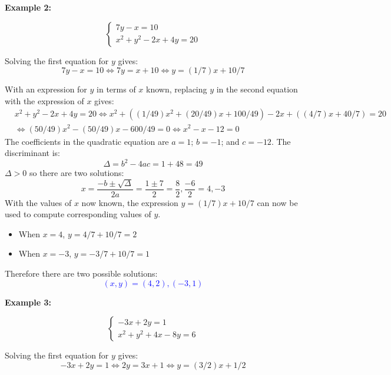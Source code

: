 \documentclass{article}
\newcommand{\dg}[1]{\textcolor{dark_green}{#1}}
\newcommand{\blue}[1]{\textcolor{blue}{#1}}
\begin{document}
\textbf{Example 2:}

\dg{\[\left\{\begin{array}{c}
7y - x = 10 \\
x^2 + y^2 - 2x + 4y = 20
\end{array}\right.\]}

Solving the first equation for \(y\) gives:
\[7y - x = 10 \iff 7y = x + 10 \iff y = (1/7)x + 10/7\]

With an expression for \(y\) in terms of \(x\) known, replacing \(y\) in the second equation with the expression of \(x\) gives:
\begin{align*}
& x^2 + y^2 - 2x + 4y = 20 
\iff x^2 + ((1/49)x^2 + (20/49)x + 100/49) - 2x + ((4/7)x + 40/7) = 20 \\
& \iff (50/49)x^2 - (50/49)x - 600/49 = 0 
\iff x^2 - x - 12 = 0   
\end{align*}
The coefficients in the quadratic equation are \(a = 1\); \(b = -1\); and \(c = -12\). The discriminant is:
\[\Delta = b^2 - 4ac = 1 + 48 = 49\]
\(\Delta > 0\) so there are two solutions:
\[x = \frac{-b \pm \sqrt{\Delta}}{2a} = \frac{1 \pm 7}{2} = \frac{8}{2}, \frac{-6}{2} = 4,-3\]
With the values of \(x\) now known, the expression \(y = (1/7)x + 10/7\) can now be used to compute corresponding values of \(y\).
\begin{itemize}
\item When \(x = 4\), \(y = 4/7 + 10/7 = 2\)
\item When \(x = -3\), \(y = -3/7 + 10/7 = 1\)
\end{itemize}
Therefore there are two possible solutions:
\blue{\[(x,y) = (4,2), (-3,1)\]}




\textbf{Example 3:}

\dg{\[\left\{\begin{array}{c}
-3x + 2y = 1 \\
x^2 + y^2 + 4x - 8y = 6
\end{array}\right.\]}

Solving the first equation for \(y\) gives:
\[-3x + 2y = 1 \iff 2y = 3x + 1 \iff y = (3/2)x + 1/2\]
\end{document}
